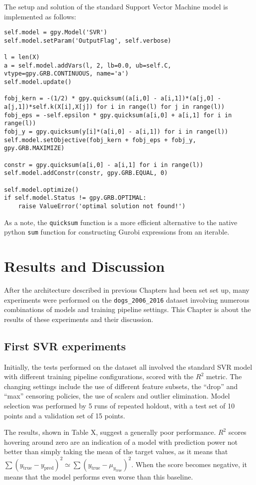 \documentclass[12pt]{report}
\begin{document}
The setup and solution of the standard Support Vector Machine model is implemented as follows:
\begin{lstlisting}
self.model = gpy.Model('SVR')
self.model.setParam('OutputFlag', self.verbose)

l = len(X)
a = self.model.addVars(l, 2, lb=0.0, ub=self.C, vtype=gpy.GRB.CONTINUOUS, name='a')
self.model.update()

fobj_kern = -(1/2) * gpy.quicksum((a[i,0] - a[i,1])*(a[j,0] - a[j,1])*self.k(X[i],X[j]) for i in range(l) for j in range(l))
fobj_eps = -self.epsilon * gpy.quicksum(a[i,0] + a[i,1] for i in range(l))
fobj_y = gpy.quicksum(y[i]*(a[i,0] - a[i,1]) for i in range(l))
self.model.setObjective(fobj_kern + fobj_eps + fobj_y, gpy.GRB.MAXIMIZE)

constr = gpy.quicksum(a[i,0] - a[i,1] for i in range(l))
self.model.addConstr(constr, gpy.GRB.EQUAL, 0)

self.model.optimize()
if self.model.Status != gpy.GRB.OPTIMAL:
	raise ValueError('optimal solution not found!')
\end{lstlisting}
As a note, the \texttt{quicksum} function is a more efficient alternative to the native python \texttt{sum} function for constructing Gurobi expressions from an iterable.

\chapter{Results and Discussion}
\label{chres}
After the architecture described in previous Chapters had been set set up, many experiments were performed on the \texttt{dogs\_2006\_2016} dataset involving numerous combinations of models and training pipeline settings. This Chapter is about the results of these experiments and their discussion.

\section{First SVR experiments}
Initially, the tests performed on the dataset all involved the standard SVR model with different training pipeline configurations, scored with the $R^2$ metric. The changing settings include the use of different feature subsets, the ``drop'' and ``max'' censoring policies, the use of scalers and outlier elimination. Model selection was performed by 5 runs of repeated holdout, with a test set of 10 points and a validation set of 15 points.

The results, shown in Table X, suggest a generally poor performance. $R^2$ scores hovering around zero are an indication of a model with prediction power not better than simply taking the mean of the target values, as it means that $\sum(y_{\text{true}} - y_{\text{pred}})^2 \simeq \sum(y_{\text{true}} - \mu_{y_{\text{true}}})^2$. When the score becomes negative, it means that the model performs even worse than this baseline.
\end{document}
